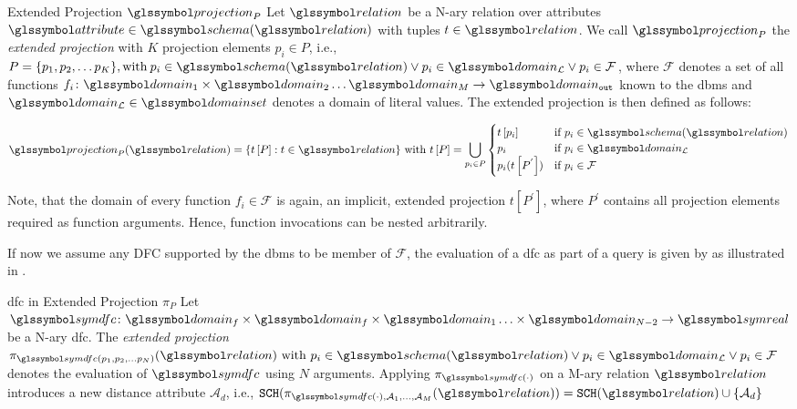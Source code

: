 \begin{definition}[label=definition:extended_projection]{Extended Projection $\projection_P$}{}
Let $\relation$ be a N-ary relation over attributes $\attribute \in \schema (\relation)$ with tuples $t \in \relation$. We call $\projection_{P}$ the \emph{extended projection} with $K$ projection elements $p_i \in P$, i.e., $P = \{ p_1, p_2, \ldots p_K \}, \textrm{with} \: p_i \in \schema(\relation) \vee p_i \in \domain_{\mathcal{L}} \vee p_i \in \mathcal{F}$, where $\mathcal{F}$ denotes a set of all functions $f_i \colon \domain_{1} \times \domain_{2} \ldots \domain_{M} \rightarrow \domain_{\mathtt{out}}$ known to the \acrshort{dbms} and $\domain_{\mathcal{L}} \in \domainset$ denotes a domain of literal values. The extended projection is then defined as follows:

\begin{equation*}
    \projection_{P}(\relation) =  \{ t\left[ P \right] : t \in \relation \} \textrm{ with } t\left[ P \right] = \bigcup_{p_i \in P }
    \begin{cases} 
        t \left[ p_i \right] & \text{if } p_i \in \schema(\relation) \\
        p_i  & \text{if } p_i \in \domain_{\mathcal{L}} \\
        p_i(t \left[ P^{'} \right]) & \text{if } p_i \in \mathcal{F} \\
    \end{cases}
\end{equation*}

Note, that the domain of every function $f_i \in \mathcal{F}$ is again, an implicit, extended projection $t \left[ P^{'}\right]$, where $P^{'}$ contains all projection elements required as function arguments. Hence, function invocations can be nested arbitrarily.

\end{definition}

If now we assume any DFC supported by the \acrshort{dbms} to be member of $\mathcal{F}$, the evaluation of a \acrshort{dfc} as part of a query is given by  as illustrated in .

\begin{definition}[label=definition:dfc_rel]{\acrlong{dfc} in Extended Projection $\pi_{P}$}{}
    Let $\symdfc \colon \domain_f \times \domain_f \times \domain_{1} \ldots \times \domain_{N-2} \to \symreal$ be a N-ary \acrshort{dfc}. The \emph{extended projection} $\pi_{\symdfc(p_1, p_2, \ldots p_N)}(\relation) \textrm { with } p_i \in \schema(\relation) \vee p_i \in \domain_{\mathcal{L}} \vee p_i \in \mathcal{F}$ denotes the evaluation of $\symdfc$ using $N$ arguments. Applying $\pi_{\symdfc(\cdot)}$ on a M-ary relation $\relation$ introduces a new distance attribute $\mathcal{A}_d$, i.e., $\mathtt{SCH}(\pi_{\symdfc(\cdot), \mathcal{A}_1, \ldots, \mathcal{A}_M}(\relation)) = \mathtt{SCH}(\relation) \cup \{ \mathcal{A}_d \}$
\end{definition}

